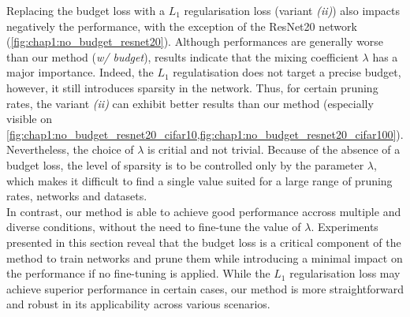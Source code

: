 Replacing the budget loss with a $L_1$ regularisation loss (variant \emph{(ii)})
also impacts negatively the performance, with the exception of the ResNet20
network (\cref{fig:chap1:no_budget_resnet20}). Although performances are
generally worse than our method (\emph{w/ budget}), results indicate that the
mixing coefficient $\lambda$ has a major importance. Indeed, the $L_1$
regulatisation does not target a precise budget, however, it still introduces
sparsity in the network. Thus, for certain pruning rates, the variant
\emph{(ii)} can exhibit better results than our method (especially visible on
\cref{fig:chap1:no_budget_resnet20_cifar10,fig:chap1:no_budget_resnet20_cifar100}).
Nevertheless, the choice of $\lambda$ is critial and not trivial. Because of the
absence of a budget loss, the level of sparsity is to be controlled only by the
parameter $\lambda$, which makes it difficult to find a single value suited for
a large range of pruning rates, networks and datasets.\\

In contrast, our method is able to achieve good performance accross multiple and
diverse conditions, without the need to fine-tune the value of $\lambda$.
Experiments presented in this section reveal that the budget loss is a critical
component of the method to train networks and prune them while introducing a
minimal impact on the performance if no fine-tuning is applied. While the $L_1$
regularisation loss may achieve superior performance in certain cases, our
method is more straightforward and robust in its applicability across various
scenarios.\\

